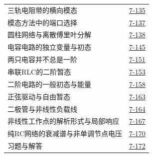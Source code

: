 \begin{longtable}{@{}p{}r@{}}
\hspace{1em}三轨电阻带的横向模态&\href{course-page:7:138}{7-135}\\[2pt]
\hspace{1em}模态方法中的端口选择&\href{course-page:7:140}{7-137}\\[2pt]
\hspace{1em}圆柱网络与离散傅里叶分解&\href{course-page:7:141}{7-138}\\[2pt]
\hspace{1em}电容电路的独立变量与初态&\href{course-page:7:148}{7-145}\\[2pt]
\hspace{1em}两只电容并不总是一阶&\href{course-page:7:154}{7-151}\\[2pt]
\hspace{1em}串联RLC的二阶暂态&\href{course-page:7:156}{7-153}\\[2pt]
\hspace{1em}二阶电路的一般初态与能量&\href{course-page:7:161}{7-158}\\[2pt]
\hspace{1em}正弦驱动与自由暂态&\href{course-page:7:166}{7-163}\\[2pt]
\hspace{1em}二极管与非线性负载线&\href{course-page:7:167}{7-164}\\[2pt]
\hspace{1em}非线性工作点的解析形式与局部响应&\href{course-page:7:170}{7-167}\\[2pt]
\hspace{1em}纯RC网络的衰减谱与非单调节点电压&\href{course-page:7:173}{7-170}\\[2pt]
\hspace{1em}习题与解答&\href{course-page:7:175}{7-172}\\[2pt]
\end{longtable}
